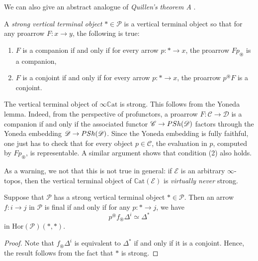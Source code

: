 \documentclass[a4paper, 11pt]{amsart}
\numberwithin{theorem}{section}
\theoremstyle{definition}
\newcommand{\cat}[1]{\textup{#1}}
\newcommand{\C}{\mathscr{C}}
\renewcommand{\D}{\mathscr{D}}
\renewcommand{\P}{\mathscr{P}}
\newcommand{\E}{\mathscr{E}}
\newcommand{\Hor}{\mathrm{Hor}}
\newcommand{\PSh}{\cat{PSh}}
\newcommand{\CCAT}{\mathbb{C}\mathrm{at}}
\begin{document}
We can also give an abstract analogue of \textit{Quillen's theorem A} \cite[Subsection 4.1.3]{HTT}.

\begin{definition}\label{def.strongly-pointed}
	A \textit{strong vertical terminal object} $\ast \in \P$ is a vertical terminal object 
	so that
	 for any proarrow $F:x\rightarrow y$, the following is true:
	\begin{enumerate}
		\item $F$ is a companion if and only if for every arrow $p : \ast \rightarrow x$, the proarrow $Fp_\circledast$ is a companion,
		\item $F$ is a conjoint if and only if for every arrow $p : \ast \rightarrow x$, the proarrow $p^\circledast F$ is a conjoint.
	\end{enumerate}
\end{definition}

\begin{example}\label{ex.ccat-strongly-pointed}
	The vertical terminal object of $\infty\CCAT$ is strong. This follows from the Yoneda lemma. 
	Indeed, from the perspective of profunctors, a proarrow $F : \C \rightarrow \D$ is a companion 
	if and only if the associated functor $\C \rightarrow \PSh(\D)$ factors through the Yoneda embedding $\D \rightarrow \PSh(\D)$. Since the Yoneda embedding 
	is fully faithful, one just has to check that for every object $p \in \C$, the evaluation in $p$, computed by $Fp_\circledast$, is representable. 
	A similar argument shows that condition (2) also holds. 
	
	As a warning, we not that this is not true in general: if $\E$ is an arbitrary $\infty$-topos, then
	the vertical terminal object of $\CCAT(\E)$ is \textit{virtually never} strong.
\end{example}

\begin{proposition}\label{prop.quillen-A}
	Suppose that $\P$ has a strong vertical terminal object $\ast \in \P$.
	Then an arrow $f: i \rightarrow j$ in $\P$ is final
	if and only if for any $p : \ast \rightarrow j$, we have
	$$
	p^\circledast f_\circledast \Delta^i \simeq \Delta^\ast 
	$$
	in $\Hor(\P)(\ast, \ast)$.
\end{proposition}
\begin{proof}
	Note that $f_\circledast \Delta^i$ is equivalent to $\Delta^\ast$ if and only if it is a conjoint. Hence, the result 
	follows from the fact that $\ast$ is strong.
\end{proof}
\end{document}

